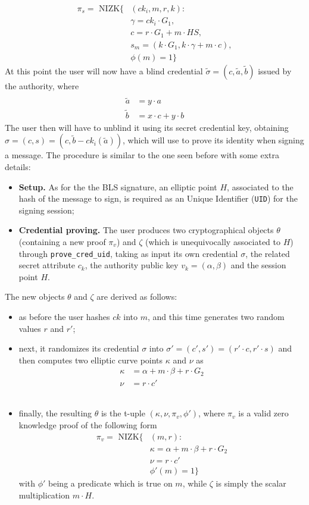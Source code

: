 \documentclass[twocolumn]{article}
\begin{document}
\begin{align*}
\pi_s = \text{ NIZK}\{&(ck_i, m, r, k): \\
&\gamma = ck_i\cdot G_1, \\
&c = r\cdot G_1 + m\cdot HS, \\
&s_m = (k \cdot G_1, k\cdot \gamma + m\cdot c), \\
&\phi(m)=1\}
\end{align*}
At this point the user will now have a blind credential $\tilde{\sigma} = (c, \tilde{a}, \tilde{b})$ issued by the authority, where
\begin{align*} \\
\tilde{a} &= y \cdot a \\
\tilde{b} &= x\cdot c + y\cdot b
\end{align*}
 The user then will have to unblind it using its secret credential key, obtaining $\sigma = (c, s) = (c, \tilde{b} - ck_i (\tilde{a}))$, which will use to prove its identity when signing a message. The procedure is similar to the one seen before with some extra details:
\begin{itemize}
    \item \textbf{Setup.} As for the the BLS signature, an elliptic point $H$, associated to the hash of the message to sign, is required as an Unique Identifier (\verb!UID!) for the signing session;
    \item \textbf{Credential proving.} The user produces two cryptographical objects $\theta$ (containing a new proof $\pi_v$) and $\zeta$ (which is unequivocally associated to $H$) through \verb!prove_cred_uid!, taking as input its own credential $\sigma$, the related secret attribute $c_k$, the authority public key $v_k = (\alpha, \beta)$ and the session point $H$.
\end{itemize}
The new objects $\theta$ and $\zeta$ are derived as follows:
\begin{itemize}
    \item as before the user hashes $ck$ into $m$, and this time generates two random values $r$ and $r'$;\\
    \item next, it randomizes its credential $\sigma$ into $\sigma' = (c', s') = (r'\cdot c, r'\cdot s)$ and then computes two elliptic curve points $\kappa$ and $\nu$ as
    \begin{align*}
        \kappa &= \alpha + m\cdot\beta + r\cdot G_2\\
        \nu &= r \cdot c'
    \end{align*}\\
    \item finally, the resulting $\theta$ is the t-uple $(\kappa, \nu, \pi_v, \phi')$, where $\pi_v$ is a valid zero knowledge proof of the following form
    \begin{align*}
        \pi_v = \text{ NIZK}\{&(m, r): \\
        &\kappa = \alpha + m\cdot\beta + r\cdot G_2\\
        &\nu = r \cdot c' \\
        &\phi'(m)=1\}
    \end{align*}
    with $\phi'$ being a predicate which is true on $m$, while $\zeta$ is simply the scalar multiplication $m\cdot H$.
\end{itemize}
\end{document}
